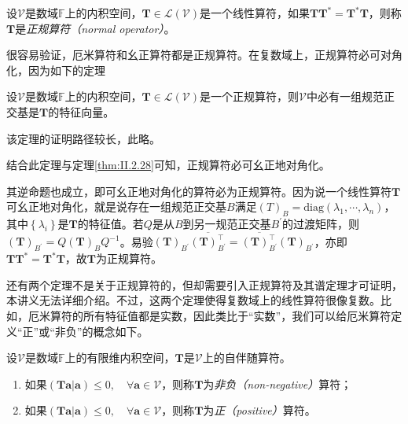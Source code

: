 \documentclass[main.tex]{subfiles}
\begin{document}
\begin{definition}[正规算符]\label{def:II.2.24}
    设$\mathcal{V}$是数域$\mathbb{F}$上的内积空间，$\mathbf{T}\in\mathcal{L}\left(\mathcal{V}\right)$是一个线性算符，如果$\mathbf{TT}^*=\mathbf{T}^*\mathbf{T}$，则称$\mathbf{T}$是\emph{正规算符（normal operator）}。
\end{definition}

很容易验证，厄米算符和幺正算符都是正规算符。在复数域上，正规算符必可对角化，因为如下的定理

\begin{theorem}\label{thm:II.2.35}
    设$\mathcal{V}$是数域$\mathbb{F}$上的内积空间，$\mathbf{T}\in\mathcal{L}\left(\mathcal{V}\right)$是一个正规算符，则$\mathcal{V}$中必有一组规范正交基是$\mathbf{T}$的特征向量。
\end{theorem}

该定理的证明路径较长，此略\cite[\S 8.5 Theorem 22]{Hoffman1971}。

结合此定理与定理\ref{thm:II.2.28}可知，正规算符必可幺正地对角化。

其逆命题也成立，即可幺正地对角化的算符必为正规算符。因为说一个线性算符$\mathbf{T}$可幺正地对角化，就是说存在一组规范正交基$B$满足$\left(T\right)_B=\mathrm{diag}\left(\lambda_1,\cdots,\lambda_n\right)$，其中$\left\{\lambda_i\right\}$是$\mathbf{T}$的特征值。若$Q$是从$B$到另一规范正交基$B^\prime$的过渡矩阵，则$\left(\mathbf{T}\right)_{B^\prime}=Q\left(\mathbf{T}\right)_{B}Q^{-1}$。易验$\left(\mathbf{T}\right)_{B^\prime}\overline{\left(\mathbf{T}\right)^\intercal_{B^\prime}}=\overline{\left(\mathbf{T}\right)^\intercal_{B^\prime}}\left(\mathbf{T}\right)_{B^\prime}$，亦即$\mathbf{TT}^*=\mathbf{T}^*\mathbf{T}$，故$\mathbf{T}$为正规算符。

还有两个定理不是关于正规算符的，但却需要引入正规算符及其谱定理才可证明，本讲义无法详细介绍。不过，这两个定理使得复数域上的线性算符很像复数。比如，厄米算符的所有特征值都是实数，因此类比于“实数”，我们可以给厄米算符定义“正”或“非负”的概念如下。

\begin{definition}\label{def:II.2.25}
    设$\mathcal{V}$是数域$\mathbb{F}$上的有限维内积空间，$\mathbf{T}$是$\mathcal{V}$上的自伴随算符。
    \begin{enumerate}
        \item 如果$\left(\mathbf{Ta}|\mathbf{a}\right)\leq 0,\quad\forall\mathbf{a}\in\mathcal{V}$，则称$\mathbf{T}$为\emph{非负（non-negative）}算符；
        \item 如果$\left(\mathbf{Ta}|\mathbf{a}\right)\leq 0,\quad\forall\mathbf{a}\in\mathcal{V}$，则称$\mathbf{T}$为\emph{正（positive）}算符。
    \end{enumerate}
\end{definition}
\end{document}

